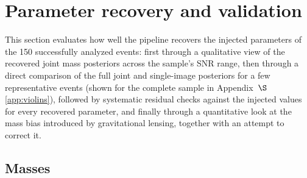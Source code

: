 \section{Parameter recovery and validation}
\label{sec:parameter_recovery}

This section evaluates how well the pipeline recovers the injected parameters of the 150 successfully analyzed events: first through a qualitative view of the recovered joint mass posteriors across the sample's SNR range, then through a direct comparison of the full joint and single-image posteriors for a few representative events (shown for the complete sample in Appendix~$\S$\ref{app:violins}), followed by systematic residual checks against the injected values for every recovered parameter, and finally through a quantitative look at the mass bias introduced by gravitational lensing, together with an attempt to correct it.

\subsection{Masses}


